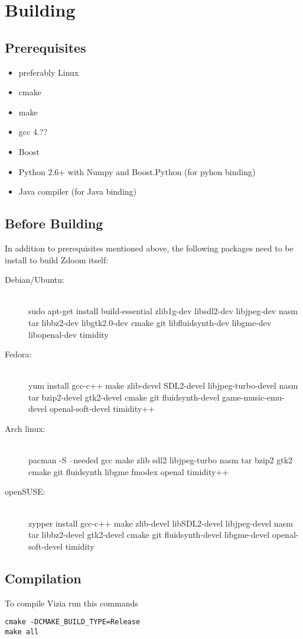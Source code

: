 \chapter{Building}
\section{Prerequisites}
\begin{itemize}
\item preferably Linux
\item cmake
\item make
\item gcc 4.??
\item Boost 
\item Python 2.6+ with Numpy and Boost.Python (for pyhon binding)
\item Java compiler (for Java binding)
\end{itemize}
\section{Before Building}
	In addition to prerequisites mentioned above, the following packages need to be install to build Zdoom itself:
	\begin{description}
		\item[Debian/Ubuntu:] \hfill \\
		sudo apt-get install build-essential zlib1g-dev libsdl2-dev libjpeg-dev nasm tar libbz2-dev libgtk2.0-dev cmake git libfluidsynth-dev libgme-dev libopenal-dev timidity
		\item[Fedora:] \hfill \\
		yum install gcc-c++ make zlib-devel SDL2-devel libjpeg-turbo-devel nasm tar bzip2-devel gtk2-devel cmake git fluidsynth-devel game-music-emu-devel	openal-soft-devel timidity++
		\item[Arch linux:] \hfill \\
		pacman -S --needed gcc make zlib sdl2 libjpeg-turbo nasm tar bzip2 gtk2 cmake git fluidsynth libgme fmodex openal timidity++
		\item[openSUSE:] \hfill \\
		zypper install gcc-c++ make zlib-devel libSDL2-devel libjpeg-devel nasm tar libbz2-devel gtk2-devel cmake git fluidsynth-devel libgme-devel openal-soft-devel timidity
	\end{description}
\section{Compilation}
To compile Vizia run this commands 
	\begin{lstlisting}
cmake -DCMAKE_BUILD_TYPE=Release
make all
	\end{lstlisting}